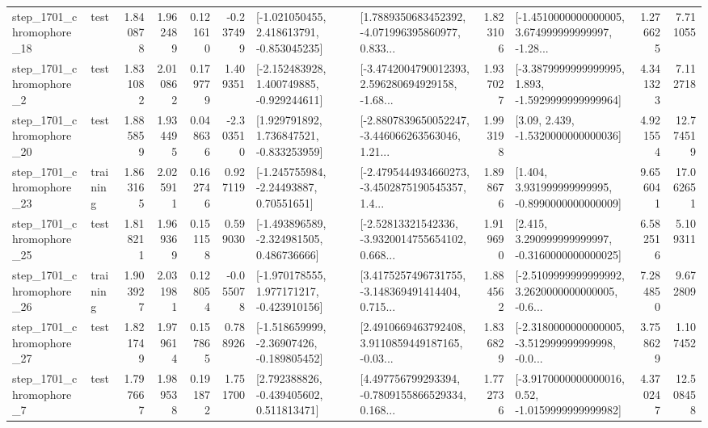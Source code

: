 \begin{tabular}{llrrrrllrlrr}
 step\_1701\_chromophore\_18 &      test &      1.840878 &    1.962489 &      0.121610 & -0.237499 &   [-1.021050455, 2.418613791, -0.853045235] &  [1.7889350683452392, -4.071996395860977, 0.833... &       1.823106 &  [-1.4510000000000005, 3.674999999999997, -1.28... &            1.276625 &          7.711055 \\
  step\_1701\_chromophore\_2 &      test &      1.831082 &    2.010862 &      0.179779 &  1.409351 &   [-2.152483928, 1.400749885, -0.929244611] &  [-3.4742004790012393, 2.596280694929158, -1.68... &       1.937027 &  [-3.3879999999999995, 1.893, -1.5929999999999964] &            4.341323 &          7.112718 \\
 step\_1701\_chromophore\_20 &      test &      1.885859 &    1.934495 &      0.048636 & -2.303510 &    [1.929791892, 1.736847521, -0.833253959] &  [-2.8807839650052247, -3.446066263563046, 1.21... &       1.993198 &                 [3.09, 2.439, -1.5320000000000036] &            4.921554 &         12.774519 \\
 step\_1701\_chromophore\_23 &  training &      1.863165 &    2.025911 &      0.162746 &  0.927119 &     [-1.245755984, -2.24493887, 0.70551651] &  [-2.4795444934660273, -3.4502875190545357, 1.4... &       1.898676 &    [1.404, 3.931999999999995, -0.8990000000000009] &            9.656041 &         17.062651 \\
 step\_1701\_chromophore\_25 &      test &      1.818211 &    1.969369 &      0.151158 &  0.599030 &   [-1.493896589, -2.324981505, 0.486736666] &  [-2.52813321542336, -3.9320014755654102, 0.668... &       1.919690 &    [2.415, 3.290999999999997, -0.3160000000000025] &            6.582516 &          5.109311 \\
 step\_1701\_chromophore\_26 &  training &      1.903927 &    2.031981 &      0.128054 & -0.055078 &   [-1.970178555, 1.977171217, -0.423910156] &  [3.4175257496731755, -3.148369491414404, 0.715... &       1.884562 &  [-2.5109999999999992, 3.2620000000000005, -0.6... &            7.284850 &          9.672809 \\
 step\_1701\_chromophore\_27 &      test &      1.821749 &    1.979614 &      0.157865 &  0.788926 &   [-1.518659999, -2.36907426, -0.189805452] &  [2.4910669463792408, 3.9110859449187165, -0.03... &       1.836829 &  [-2.3180000000000005, -3.512999999999998, -0.0... &            3.758629 &          1.107452 \\
  step\_1701\_chromophore\_7 &      test &      1.797667 &    1.989538 &      0.191872 &  1.751700 &    [2.792388826, -0.439405602, 0.511813471] &  [4.497756799293394, -0.7809155866529334, 0.168... &       1.772736 &   [-3.9170000000000016, 0.52, -1.0159999999999982] &            4.370247 &         12.508458 \\

\end{tabular}
